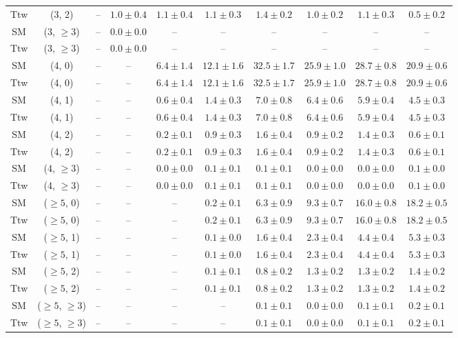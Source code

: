 \begin{table}[h!]
{\begin{tabular}{cccccccccc}
	Ttw & (3, 2) & -- & $1.0\pm 0.4$ & $1.1\pm 0.4$ & $1.1\pm 0.3$ & $1.4\pm 0.2$ & $1.0\pm 0.2$ & $1.1\pm 0.3$ & $0.5\pm 0.2$ \\[0.5ex] 
	SM & (3, $\ge3$) & -- & $0.0\pm 0.0$ & -- & -- & -- & -- & -- & -- \\[0.5ex] 
	Ttw & (3, $\ge3$) & -- & $0.0\pm 0.0$ & -- & -- & -- & -- & -- & -- \\[0.5ex] 
	SM & (4, 0) & -- & -- & $6.4\pm 1.4$ & $12.1\pm 1.6$ & $32.5\pm 1.7$ & $25.9\pm 1.0$ & $28.7\pm 0.8$ & $20.9\pm 0.6$ \\[0.5ex] 
	Ttw & (4, 0) & -- & -- & $6.4\pm 1.4$ & $12.1\pm 1.6$ & $32.5\pm 1.7$ & $25.9\pm 1.0$ & $28.7\pm 0.8$ & $20.9\pm 0.6$ \\[0.5ex] 
	SM & (4, 1) & -- & -- & $0.6\pm 0.4$ & $1.4\pm 0.3$ & $7.0\pm 0.8$ & $6.4\pm 0.6$ & $5.9\pm 0.4$ & $4.5\pm 0.3$ \\[0.5ex] 
	Ttw & (4, 1) & -- & -- & $0.6\pm 0.4$ & $1.4\pm 0.3$ & $7.0\pm 0.8$ & $6.4\pm 0.6$ & $5.9\pm 0.4$ & $4.5\pm 0.3$ \\[0.5ex] 
	SM & (4, 2) & -- & -- & $0.2\pm 0.1$ & $0.9\pm 0.3$ & $1.6\pm 0.4$ & $0.9\pm 0.2$ & $1.4\pm 0.3$ & $0.6\pm 0.1$ \\[0.5ex] 
	Ttw & (4, 2) & -- & -- & $0.2\pm 0.1$ & $0.9\pm 0.3$ & $1.6\pm 0.4$ & $0.9\pm 0.2$ & $1.4\pm 0.3$ & $0.6\pm 0.1$ \\[0.5ex] 
	SM & (4, $\ge3$) & -- & -- & $0.0\pm 0.0$ & $0.1\pm 0.1$ & $0.1\pm 0.1$ & $0.0\pm 0.0$ & $0.0\pm 0.0$ & $0.1\pm 0.0$ \\[0.5ex] 
	Ttw & (4, $\ge3$) & -- & -- & $0.0\pm 0.0$ & $0.1\pm 0.1$ & $0.1\pm 0.1$ & $0.0\pm 0.0$ & $0.0\pm 0.0$ & $0.1\pm 0.0$ \\[0.5ex] 
	SM & ($\ge5$, 0) & -- & -- & -- & $0.2\pm 0.1$ & $6.3\pm 0.9$ & $9.3\pm 0.7$ & $16.0\pm 0.8$ & $18.2\pm 0.5$ \\[0.5ex] 
	Ttw & ($\ge5$, 0) & -- & -- & -- & $0.2\pm 0.1$ & $6.3\pm 0.9$ & $9.3\pm 0.7$ & $16.0\pm 0.8$ & $18.2\pm 0.5$ \\[0.5ex] 
	SM & ($\ge5$, 1) & -- & -- & -- & $0.1\pm 0.0$ & $1.6\pm 0.4$ & $2.3\pm 0.4$ & $4.4\pm 0.4$ & $5.3\pm 0.3$ \\[0.5ex] 
	Ttw & ($\ge5$, 1) & -- & -- & -- & $0.1\pm 0.0$ & $1.6\pm 0.4$ & $2.3\pm 0.4$ & $4.4\pm 0.4$ & $5.3\pm 0.3$ \\[0.5ex] 
	SM & ($\ge5$, 2) & -- & -- & -- & $0.1\pm 0.1$ & $0.8\pm 0.2$ & $1.3\pm 0.2$ & $1.3\pm 0.2$ & $1.4\pm 0.2$ \\[0.5ex] 
	Ttw & ($\ge5$, 2) & -- & -- & -- & $0.1\pm 0.1$ & $0.8\pm 0.2$ & $1.3\pm 0.2$ & $1.3\pm 0.2$ & $1.4\pm 0.2$ \\[0.5ex] 
	SM & ($\ge5$, $\ge3$) & -- & -- & -- & -- & $0.1\pm 0.1$ & $0.0\pm 0.0$ & $0.1\pm 0.1$ & $0.2\pm 0.1$ \\[0.5ex] 
	Ttw & ($\ge5$, $\ge3$) & -- & -- & -- & -- & $0.1\pm 0.1$ & $0.0\pm 0.0$ & $0.1\pm 0.1$ & $0.2\pm 0.1$ \\[0.5ex] 
	\hline
	\hline
\end{tabular}}
\end{table}
